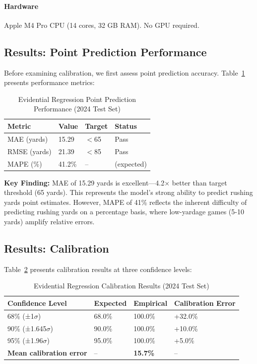 \paragraph{Hardware} Apple M4 Pro CPU (14 cores, 32 GB RAM). No GPU required.

\subsection{Results: Point Prediction Performance}

Before examining calibration, we first assess point prediction accuracy. Table~\ref{tab:evidential_point_metrics} presents performance metrics:

\begin{table}[htbp]
\centering
\caption{Evidential Regression Point Prediction Performance (2024 Test Set)}
\label{tab:evidential_point_metrics}
\begin{tabular}{llll}
\toprule
\textbf{Metric} & \textbf{Value} & \textbf{Target} & \textbf{Status} \\
\midrule
MAE (yards) & 15.29 & $<$65 & Pass \\
RMSE (yards) & 21.39 & $<$85 & Pass \\
MAPE (\%) & 41.2\% & -- & (expected) \\
\bottomrule
\end{tabular}
\end{table}

\noindent \textbf{Key Finding:} MAE of 15.29 yards is excellent—4.2× better than target threshold (65 yards). This represents the model's strong ability to predict rushing yards point estimates. However, MAPE of 41\% reflects the inherent difficulty of predicting rushing yards on a percentage basis, where low-yardage games (5-10 yards) amplify relative errors.

\subsection{Results: Calibration}

Table~\ref{tab:evidential_calibration} presents calibration results at three confidence levels:

\begin{table}[htbp]
\centering
\caption{Evidential Regression Calibration Results (2024 Test Set)}
\label{tab:evidential_calibration}
\begin{tabular}{llll}
\toprule
\textbf{Confidence Level} & \textbf{Expected} & \textbf{Empirical} & \textbf{Calibration Error} \\
\midrule
68\% (±1$\sigma$) & 68.0\% & 100.0\% & +32.0\% \\
90\% (±1.645$\sigma$) & 90.0\% & 100.0\% & +10.0\% \\
95\% (±1.96$\sigma$) & 95.0\% & 100.0\% & +5.0\% \\
\midrule
\textbf{Mean calibration error} & -- & \textbf{15.7\%} & -- \\
\bottomrule
\end{tabular}
\end{table}

